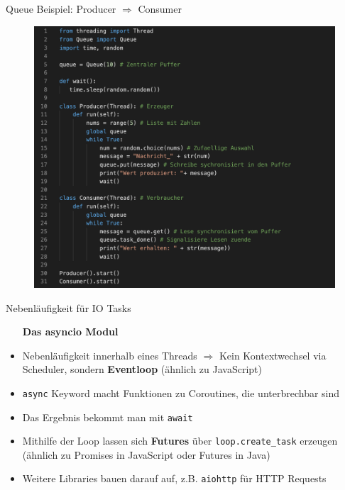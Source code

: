 \begin{frame}{Queue Beispiel: Producer $\Rightarrow$  Consumer} %
     \begin{figure}[!htb]
        \includegraphics[scale=0.31]{6-python3/img/producerconsumer} 
    \end{figure}
\end{frame}

\begin{frame}{Nebenläufigkeit für IO Tasks}
     \begin{itemize}
        \setlength{\itemindent}{1.2in}
        \item [\textbf{Das asyncio Modul}] 
    \end{itemize}
    \begin{itemize}
        \item Nebenläufigkeit innerhalb eines Threads $\Rightarrow$ Kein Kontextwechsel via Scheduler, sondern \textbf{Eventloop} (ähnlich zu JavaScript)
        \item \texttt{async} Keyword macht Funktionen zu Coroutines, die unterbrechbar sind
        \item Das Ergebnis bekommt man mit \texttt{await}
        \item Mithilfe der Loop lassen sich \textbf{Futures} über  \texttt{loop.create\_task} erzeugen (ähnlich zu Promises in JavaScript oder Futures in Java)
        \item Weitere Libraries bauen darauf auf, z.B. \texttt{aiohttp} für HTTP Requests
      \end{itemize}

\end{frame}


